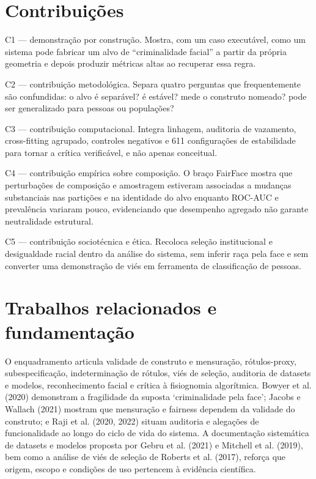 \section{Contribuições}

\begin{contribution}C1 --- demonstração por construção. Mostra, com um caso executável, como um sistema pode fabricar um alvo de ``criminalidade facial'' a partir da própria geometria e depois produzir métricas altas ao recuperar essa regra.\end{contribution}

\begin{contribution}C2 --- contribuição metodológica. Separa quatro perguntas que frequentemente são confundidas: o alvo é separável? é estável? mede o construto nomeado? pode ser generalizado para pessoas ou populações?\end{contribution}

\begin{contribution}C3 --- contribuição computacional. Integra linhagem, auditoria de vazamento, cross-fitting agrupado, controles negativos e 611 configurações de estabilidade para tornar a crítica verificável, e não apenas conceitual.\end{contribution}

\begin{contribution}C4 --- contribuição empírica sobre composição. O braço FairFace mostra que perturbações de composição e amostragem estiveram associadas a mudanças substanciais nas partições e na identidade do alvo enquanto ROC-AUC e prevalência variaram pouco, evidenciando que desempenho agregado não garante neutralidade estrutural.\end{contribution}

\begin{contribution}C5 --- contribuição sociotécnica e ética. Recoloca seleção institucional e desigualdade racial dentro da análise do sistema, sem inferir raça pela face e sem converter uma demonstração de viés em ferramenta de classificação de pessoas.\end{contribution}

\section{Trabalhos relacionados e fundamentação}

O enquadramento articula validade de construto e mensuração, rótulos-proxy, subespecificação, indeterminação de rótulos, viés de seleção, auditoria de datasets e modelos, reconhecimento facial e crítica à fisiognomia algorítmica. Bowyer et al. (2020) demonstram a fragilidade da suposta `criminalidade pela face'; Jacobs e Wallach (2021) mostram que mensuração e fairness dependem da validade do construto; e Raji et al. (2020, 2022) situam auditoria e alegações de funcionalidade ao longo do ciclo de vida do sistema. A documentação sistemática de datasets e modelos proposta por Gebru et al. (2021) e Mitchell et al. (2019), bem como a análise de viés de seleção de Roberts et al. (2017), reforça que origem, escopo e condições de uso pertencem à evidência científica.

